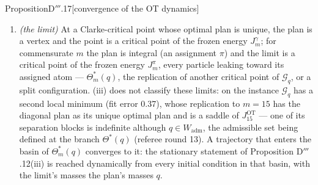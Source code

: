 \begin{thm}{Proposition}{D$'''$.17}[convergence of the OT dynamics]
\begin{enumerate}[label=\textup{(\roman*)}]
    inequality every bounded subgradient trajectory has finite length and converges to a Clarke-critical point.
    Every vertex-selection and every generalised solution of \textup{($\mathfrak{A}_m^{\mathrm{OT}}$)} is such a
    trajectory, bounded by Step~0's a priori estimate with $\operatorname{conv}\supp\nu$; hence it converges, and so
    do the solutions of \textup{($\mathfrak{A}_m^\nu$)} (a minimum over the Voronoi assignments) and of
    \textup{($\mathfrak{A}_m$)} (smooth: {\L}ojasiewicz's gradient inequality for real-analytic functions, in
    Kurdyka's form for definable ones~\cite{S44}).
  \item \emph{(the limit)} At a Clarke-critical point whose optimal plan is unique, the plan is a vertex and the
    point is a critical point of the frozen energy $J^\gamma_m$; for commensurate $m$ the plan is integral (an
    assignment $\pi$) and the limit is a critical point of the frozen energy $J^\pi_m$, every particle leaking toward
    its assigned atom --- $\Theta^*_m(q)$, the replication of another critical point of $\mathcal{G}_q$, or a split
    configuration. (iii) does not classify these limits: on the instance $\mathcal{G}_q$ has a second local minimum
    (fit error 0.37), whose replication to $m = 15$ has the diagonal plan as its unique optimal plan and is a saddle
    of $J^{\mathrm{OT}}_{15}$ --- one of its separation blocks is indefinite although $q\in W_{\mathrm{adm}}$, the
    admissible set being defined at the branch $\Theta^*(q)$ (referee round 13). A trajectory that enters the basin
    of $\Theta^*_m(q)$ converges to it: the stationary statement of Proposition D$'''$.12(iii) is reached dynamically
    from every initial condition in that basin, with the limit's masses the plan's masses $q$.
\end{enumerate}
\end{thm}
